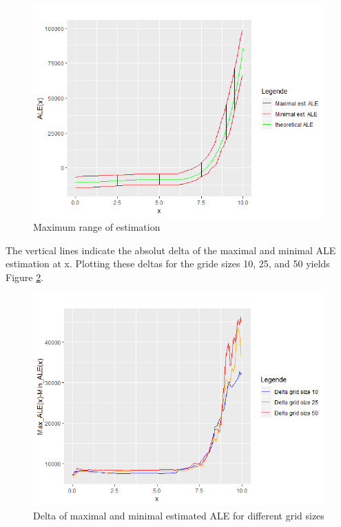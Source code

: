 \documentclass[
]{krantz}
\begin{document}
\begin{figure}
\includegraphics[width=1\linewidth]{images/ALE_2_ALErange_10_} \caption{Maximum range of estimation}\label{fig:exampleALE2b}
\end{figure}



The vertical lines indicate the absolut delta of the maximal and minimal ALE estimation at x. Plotting these deltas for the gride sizes 10, 25, and 50 yields Figure \ref{fig:exampleALE2c}.

\begin{figure}
\includegraphics[width=1\linewidth]{images/ALE_2_example2.1_delta_} \caption{Delta of maximal and minimal estimated ALE for different grid sizes}\label{fig:exampleALE2c}
\end{figure}
\end{document}
